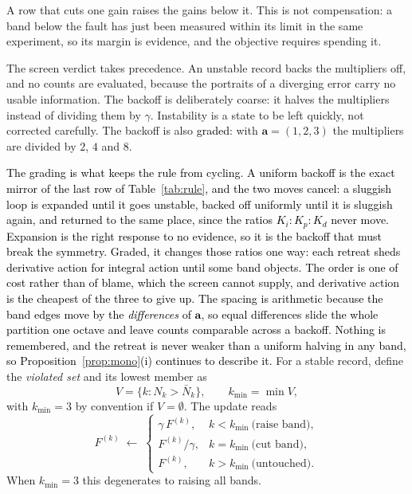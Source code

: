 \documentclass[final,3p,times,twocolumn]{elsarticle}
\newcommand{\new}[1]{\textcolor{black}{#1}}  %
\begin{document}
A row that cuts one gain raises the gains below it. This is not
compensation: a band below the fault has just been measured within its
limit in the same experiment, so its margin is evidence, and the
objective requires spending it.

The screen verdict takes precedence. An unstable record backs the
multipliers off, and no counts are evaluated, because the portraits of
a diverging error carry no usable information. The backoff is
deliberately coarse: it halves the multipliers instead of dividing them
by $\gamma$. Instability is a state to be left quickly, not corrected
carefully. The backoff is also \new{graded}: with
$\mathbf a = (1,2,3)$ the multipliers are divided by $2$, $4$ and $8$.

\new{The grading is what keeps the rule from cycling. A uniform backoff
is the exact mirror of the last row of Table~\ref{tab:rule}, and the two
moves cancel: a sluggish loop is expanded until it goes unstable, backed
off uniformly until it is sluggish again, and returned to the same
place, since the ratios $K_i \!:\! K_p \!:\! K_d$ never move. Expansion
is the right response to no evidence, so it is the backoff that must
break the symmetry. Graded, it changes those ratios one way: each
retreat sheds derivative action for integral action until some band
objects. The order is one of cost rather than of blame, which the screen cannot
supply, and derivative action is the cheapest of the three to give up.
The spacing is arithmetic because the band edges move by the
\emph{differences} of $\mathbf a$, so equal differences slide the whole
partition one octave and leave counts comparable across a backoff. Nothing is remembered, and the retreat is never weaker than
a uniform halving in any band, so
Proposition~\ref{prop:mono}(i) continues to describe it.}
For a stable record, define the \emph{violated set} and its lowest
member as
\begin{equation}
V = \{k : N_k > \bar N_k\}, \qquad k_{\min} = \min V,
\end{equation}
with $k_{\min} = 3$ by convention if $V = \emptyset$. The update reads
\begin{equation}
F^{(k)} \;\leftarrow\;
\begin{cases}
\gamma\, F^{(k)}, & k < k_{\min} \ \text{(raise band)},\\[1mm]
F^{(k)}/\gamma, & k = k_{\min} \ \text{(cut band)},\\[1mm]
F^{(k)}, & k > k_{\min} \ \text{(untouched)}.
\end{cases}
\label{eq:triangular}
\end{equation}
When $k_{\min} = 3$ this degenerates to raising all bands.
\end{document}
